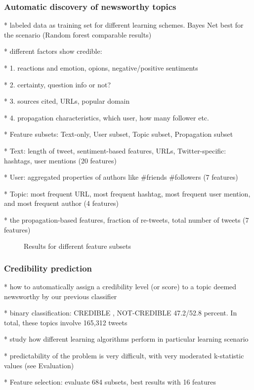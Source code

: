 \documentclass{proseminar}
\begin{document}
\subsubsection*{Automatic discovery of newsworthy topics}
* labeled data as training set for different learning schemes. Bayes Net best for the scenario (Random forest comparable results)

* different factors show credible:

* 1. reactions and emotion, opions, negative/positive sentiments 

* 2. certainty, question info or not?

* 3. sources cited, URLs, popular domain

* 4. propagation characteristics, which user, how many follower etc.

* Feature subsets: Text-only, User subset, Topic subset, Propagation subset

* Text: length of tweet, sentiment-based features, URLs, Twitter-specific: hashtags, user mentions (20 features)

* User: aggregated properties of authors like \#friends \#followers (7 features)

* Topic: most frequent URL, most frequent hashtag, most frequent user mention, and most frequent author (4 features)

*  the propagation-based features, fraction of re-tweets, total number of tweets (7 features)

\begin{figure}[h]
\centering
{}
\caption{Results for different feature subsets}
\end{figure}

\subsubsection*{Credibility prediction}
* how to automatically assign a credibility level (or score) to a topic deemed newsworthy by our previous classifier

*  binary classification:  CREDIBLE , NOT-CREDIBLE 47.2/52.8 percent. In total, these topics involve 165,312 tweets

*  study how different learning algorithms perform in particular learning scenario

*  predictability of the problem is very difficult, with very moderated k-statistic values (see Evaluation)

* Feature selection:  evaluate 684 subsets, best results with 16 features
\end{document}
